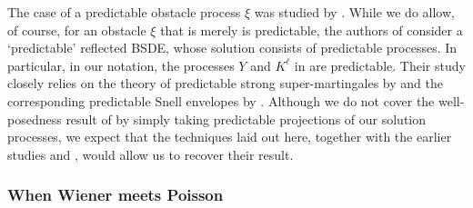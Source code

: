 \documentclass[10pt]{article} %
\begin{document}
The case of a predictable obstacle process $\xi$ was studied by \citeauthor*{bouhadou2018non} \cite{bouhadou2018non}. While we do allow, of course, for an obstacle $\xi$ that is merely is predictable, the authors of \cite{bouhadou2018non} consider a `predictable' reflected BSDE, whose solution consists of predictable processes. In particular, in our notation, the processes $Y$ and $K^\ell$ in \cite{bouhadou2018non} are predictable. Their study closely relies on the theory of predictable strong super-martingales by \citeauthor*{meyer1976cours} \cite[page 388]{meyer1976cours} and the corresponding predictable Snell envelopes by \citeauthor*{karoui1978arret} \cite{karoui1978arret}. Although we do not cover the well-posedness result of \cite{bouhadou2018non} by simply taking predictable projections of our solution processes, we expect that the techniques laid out here, together with the earlier studies \cite{karoui1978arret} and \cite{meyer1976cours}, would allow us to recover their result.


\subsubsection{When Wiener meets Poisson}
\end{document}

